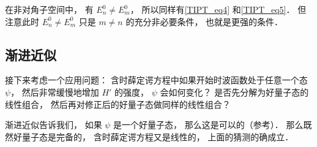 在非对角子空间中， 有 $E_n^0 \ne E_m^0$， 所以同样有\autoref{TIPT_eq4} 和\autoref{TIPT_eq5}． 但注意此时 $E_n^0 \ne E_m^0$ 只是 $m \ne n$ 的充分非必要条件， 也就是更强的条件．

\subsection{渐进近似}
接下来考虑一个应用问题： 含时薛定谔方程中如果开始时波函数处于任意一个态 $\psi$， 然后非常缓慢地增加 $H'$ 的强度， $\psi$ 会如何变化？ 是否先分解为好量子态的线性组合， 然后再对修正后的好量子态做同样的线性组合？

渐进近似告诉我们， 如果 $\psi$ 是一个好量子态， 那么这是可以的（参考\cite{GriffQ}）． 那么既然好量子态是完备的， 含时薛定谔方程又是线性的， 上面的猜测的确成立．
